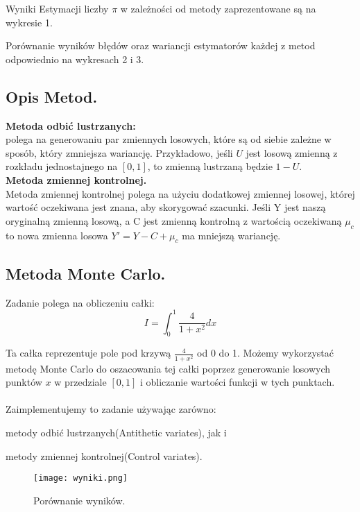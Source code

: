 \documentclass[12pt,letterpaper]{article}
\theoremstyle{definition}
\begin{document}
Wyniki Estymacji liczby $\pi$ w zależności od metody zaprezentowane są na wykresie 1.

Porównanie wyników błędów oraz wariancji estymatorów każdej z metod odpowiednio na wykresach 2 i 3.

\subsection{Opis Metod.}


\textbf{Metoda odbić lustrzanych:}\\
polega na generowaniu par zmiennych losowych, które są od siebie zależne w sposób, który zmniejsza wariancję. Przykładowo, jeśli $U$ jest losową zmienną z rozkładu jednostajnego na $[0,1]$, to zmienną lustrzaną będzie $1-U$.\\


\textbf{Metoda zmiennej kontrolnej.}\\
Metoda zmiennej kontrolnej polega na użyciu dodatkowej zmiennej losowej, której wartość oczekiwana jest znana, aby skorygować szacunki. Jeśli 
Y jest naszą oryginalną zmienną losową, a 
C jest zmienną kontrolną z wartością oczekiwaną $\mu_c $ to nowa zmienna losowa $Y' = Y -C +\mu_c$ ma mniejszą wariancję.

\subsection{Metoda Monte Carlo.}

Zadanie polega na obliczeniu całki:
$$I=\int_0^1 \frac{4}{1+x^2} dx$$

Ta całka reprezentuje pole pod krzywą $\frac{4}{1+x^2}$ od 0 do 1. Możemy wykorzystać metodę Monte Carlo do oszacowania tej całki poprzez generowanie losowych punktów $x$ w przedziale $[0,1]$ i obliczanie wartości funkcji w tych punktach.\\
\\
Zaimplementujemy to zadanie używając zarówno: 

metody odbić lustrzanych(Antithetic variates), jak i 

metody zmiennej kontrolnej(Control variates).

\begin{figure}[H]
			\centering

				\centering
				\texttt{[image: wyniki.png]}
				\caption{Porównanie wyników.}
				\label{fig:zdjecie1}
			\hfill
		\end{figure}
  
\end{document}
